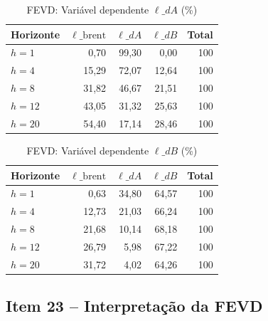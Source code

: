 \documentclass[12pt,a4paper]{article}
\begin{document}
\begin{table}[H]
\centering
\caption{FEVD: Variável dependente $\ell\_dA$ (\%)}
\label{tab:fevd_dA}
\begin{tabular}{lrrrr}
\toprule
Horizonte & $\ell\_\text{brent}$ & $\ell\_dA$ & $\ell\_dB$ & Total \\
\midrule
$h = 1$  &  0,70 & 99,30 &  0,00 & 100 \\
$h = 4$  & 15,29 & 72,07 & 12,64 & 100 \\
$h = 8$  & 31,82 & 46,67 & 21,51 & 100 \\
$h = 12$ & 43,05 & 31,32 & 25,63 & 100 \\
$h = 20$ & 54,40 & 17,14 & 28,46 & 100 \\
\bottomrule
\end{tabular}
\end{table}

\begin{table}[H]
\centering
\caption{FEVD: Variável dependente $\ell\_dB$ (\%)}
\label{tab:fevd_dB}
\begin{tabular}{lrrrr}
\toprule
Horizonte & $\ell\_\text{brent}$ & $\ell\_dA$ & $\ell\_dB$ & Total \\
\midrule
$h = 1$  &  0,63 & 34,80 & 64,57 & 100 \\
$h = 4$  & 12,73 & 21,03 & 66,24 & 100 \\
$h = 8$  & 21,68 & 10,14 & 68,18 & 100 \\
$h = 12$ & 26,79 &  5,98 & 67,22 & 100 \\
$h = 20$ & 31,72 &  4,02 & 64,26 & 100 \\
\bottomrule
\end{tabular}
\end{table}

\subsection{Item 23 -- Interpretação da FEVD}
\end{document}
